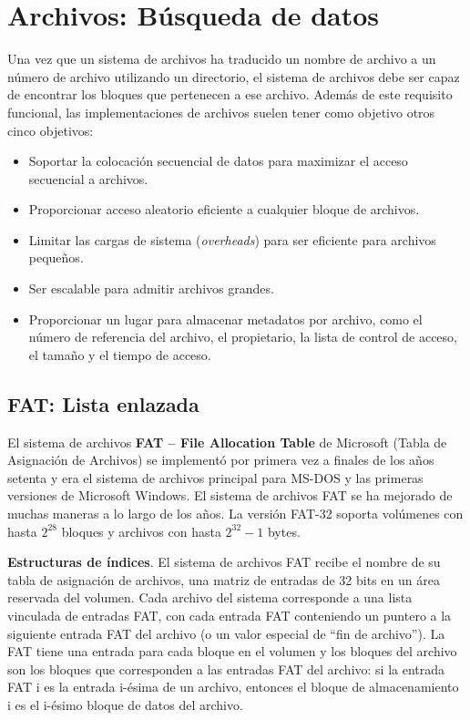 \documentclass[10pt]{book}
\begin{document}
\section{Archivos: Búsqueda de datos}
Una vez que un sistema de archivos ha traducido un nombre de archivo a un número de archivo utilizando un directorio, el sistema de archivos debe ser capaz de encontrar los bloques que pertenecen a ese archivo. Además de este requisito funcional, las implementaciones de archivos suelen tener como objetivo otros cinco objetivos:
\begin{itemize}
\item Soportar la colocación secuencial de datos para maximizar el acceso secuencial a archivos.
\item Proporcionar acceso aleatorio eficiente a cualquier bloque de archivos.
\item Limitar las cargas de sistema (\textit{overheads}) para ser eficiente para archivos pequeños.
\item Ser escalable para admitir archivos grandes.
\item Proporcionar un lugar para almacenar metadatos por archivo, como el número de referencia del archivo, el propietario, la lista de control de acceso, el tamaño y el tiempo de acceso.
\end{itemize}

\subsection{FAT: Lista enlazada}
El sistema de archivos \textbf{FAT -- File Allocation Table} de Microsoft (Tabla de Asignación de Archivos) se implementó por primera vez a finales de los años setenta y era el sistema de archivos principal para MS-DOS y las primeras versiones de Microsoft Windows. El sistema de archivos FAT se ha mejorado de muchas maneras a lo largo de los años. La versión FAT-32 soporta volúmenes con hasta $2^{28}$ bloques y archivos con hasta $2^{32} - 1$ bytes.

\textbf{Estructuras de índices}. El sistema de archivos FAT recibe el nombre de su tabla de asignación de archivos, una matriz de entradas de 32 bits en un área reservada del volumen. Cada archivo del sistema corresponde a una lista vinculada de entradas FAT, con cada entrada FAT conteniendo un puntero a la siguiente entrada FAT del archivo (o un valor especial de ``fin de archivo''). La FAT tiene una entrada para cada bloque en el volumen y los bloques del archivo son los bloques que corresponden a las entradas FAT del archivo: si la entrada FAT i es la entrada i-ésima de un archivo, entonces el bloque de almacenamiento i es el i-ésimo bloque de datos del archivo.
\end{document}
